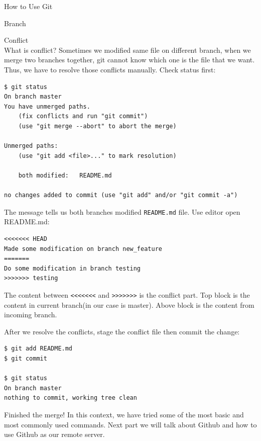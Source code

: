 \documentclass[12pt, a4papaer]{article}
\begin{document}
\begin{section}{How to Use Git}
\begin{subsection}{Branch}
\begin{paragraph}{Conflict\\}
What is conflict? Sometimes we modified same file on different branch, when we
merge two branches together, git cannot know which one is the file that we want.
Thus, we have to resolve those conflicts manually. Check status first:

\begin{lstlisting}
$ git status
On branch master
You have unmerged paths.
    (fix conflicts and run "git commit")
    (use "git merge --abort" to abort the merge)

Unmerged paths:
    (use "git add <file>..." to mark resolution)

    both modified:   README.md

no changes added to commit (use "git add" and/or "git commit -a")
\end{lstlisting}

The message tells us both branches modified \verb|README.md| file.
Use editor open README.md:

\begin{lstlisting}
<<<<<<< HEAD
Made some modification on branch new_feature
=======
Do some modification in branch testing
>>>>>>> testing
\end{lstlisting}

The content between \verb|<<<<<<<| and \verb|>>>>>>>| is the conflict part.
Top block is the content in current branch(in our case is master). Above block
is the content from incoming branch.

After we resolve the conflicts, stage the conflict file then commit the change:

\begin{lstlisting}
$ git add README.md
$ git commit

$ git status
On branch master
nothing to commit, working tree clean
\end{lstlisting}

Finished the merge! In this context, we have tried some of the most basic and
most commonly used commands. Next part we will talk about Github and how to use
Github as our remote server.
\end{paragraph}

\end{subsection}
\end{section}

\end{document}
